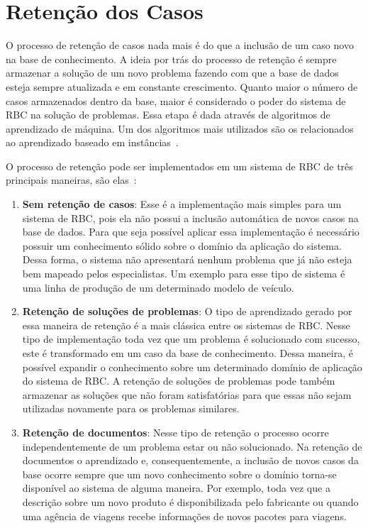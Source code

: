 \section{Retenção dos Casos}
\label{sec:retencaocasos} 
O processo de retenção de casos nada mais é do que a inclusão de um caso novo na base de conhecimento. A ideia por trás do processo de retenção é sempre armazenar a solução de um novo problema fazendo com que a base de dados esteja sempre atualizada e em constante crescimento. Quanto maior o número de casos armazenados dentro da base, maior é considerado o poder do sistema de RBC na solução de problemas. Essa etapa é dada através de algoritmos de aprendizado de máquina. Um dos algoritmos mais utilizados são os relacionados ao aprendizado baseado em instâncias~\cite{Gresse:2003}. 

O processo de retenção pode ser implementados em um sistema de RBC de três principais maneiras, são elas~\cite{Gresse:2003}:

\begin{enumerate}
	\item \textbf{Sem retenção de casos}: Esse é a implementação mais simples para um sistema de RBC, pois ela não possui a inclusão automática de novos casos na base de dados. Para que seja possível aplicar essa implementação é necessário possuir um conhecimento sólido sobre o domínio da aplicação do sistema. Dessa forma, o sistema não apresentará nenhum problema que já não esteja bem mapeado pelos especialistas. Um exemplo para esse tipo de sistema é uma linha de produção de um determinado modelo de veículo.
	\item \textbf{Retenção de soluções de problemas}: O tipo de aprendizado gerado por essa maneira de retenção é a mais clássica entre os sistemas de RBC. Nesse tipo de implementação toda vez que um problema é solucionado com sucesso, este é transformado em um caso da base de conhecimento. Dessa maneira, é possível expandir o conhecimento sobre um determinado domínio de aplicação do sistema de RBC. A retenção de soluções de problemas pode também armazenar as soluções que não foram satisfatórias para que essas não sejam utilizadas novamente para os problemas similares.
	\item \textbf{Retenção de documentos}: Nesse tipo de retenção o processo ocorre independentemente de um problema estar ou não solucionado. Na retenção de documentos o aprendizado e, consequentemente, a inclusão de novos casos da base ocorre sempre que um novo conhecimento sobre o domínio torna-se disponível ao sistema de alguma maneira. Por exemplo, toda vez que a descrição sobre um novo produto é disponibilizada pelo fabricante ou quando uma agência de viagens recebe informações de novos pacotes para viagens.
\end{enumerate}

